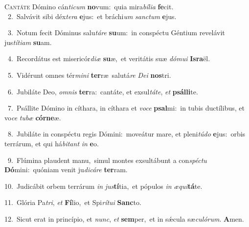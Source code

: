 \lettrine{\initial\textcolor{\initialcolor}{C}}{antáte} Dómino cán\-\textit{ti}\-\textit{cum} \textbf{no}\-vum:~\star quia mira\-\textit{bí}\-\textit{li}\textit{a} \textbf{fe}\-cit.\\
{\numbfont\textcolor{\numbcolor}{~2.}}~Salvávit sibi déx\-\textit{te}\-\textit{ra} \textbf{e}\-jus:~\star et bráchi\textit{um} \textit{sanc}\-\textit{tum} \textbf{e}\-jus.\par
{\numbfont\textcolor{\numbcolor}{~3.}}~Notum fecit Dóminus salu\-\textit{tá}\-\textit{re} \textbf{su}\-um:~\star in conspéctu Géntium revelávit jus\-\textit{tí}\-\textit{ti}\textit{am} \textbf{su}\-am.\par
{\numbfont\textcolor{\numbcolor}{~4.}}~Recordátus est misericór\-\textit{di}\-\textit{æ} \textbf{su}\-æ,~\star et veritátis suæ \textit{dó}\-\textit{mu}\textit{i} \textbf{Is}\-\textbf{ra}ël.\par
{\numbfont\textcolor{\numbcolor}{~5.}}~Vidérunt omnes tér\-\textit{mi}\-\textit{ni} \textbf{ter}\-ræ~\star salutá\textit{re} \textit{De}\-\textit{i} \textbf{nos}\-tri.\par
{\numbfont\textcolor{\numbcolor}{~6.}}~Jubiláte Deo, \textit{om}\-\textit{nis} \textbf{ter}\-ra:~\star cantáte, et exsul\-\textit{tá}\-\textit{te}, \textit{et} \textbf{psál}\-\textbf{li}te.\par
{\numbfont\textcolor{\numbcolor}{~7.}}~Psállite Dómino in cíthara, in cíthara et \textit{vo}\-\textit{ce} \textbf{psal}\-mi:~\star in tubis ductílibus, et vo\textit{ce} \textit{tu}\-\textit{bæ} \textbf{cór}\-\textbf{ne}æ.\par
{\numbfont\textcolor{\numbcolor}{~8.}}~Jubiláte in conspéctu regis Dómini:~\dagger moveátur mare, et pleni\-\textit{tú}\-\textit{do} \textbf{e}\-jus:~\star orbis terrárum, et qui há\-\textit{bi}\-\textit{tant} \textit{in} \textbf{e}\-o.\par
{\numbfont\textcolor{\numbcolor}{~9.}}~Flúmina plaudent manu,~\dagger simul montes exsultábunt a con\-\textit{spéc}\-\textit{tu} \textbf{Dó}\-mini:~\star quóniam venit ju\-\textit{di}\-\textit{cá}\textit{re} \textbf{ter}\-ram.\par
{\numbfont\textcolor{\numbcolor}{10.}}~Judicábit orbem terrárum \textit{in} \textit{jus}\-\textbf{tí}tia,~\star et pópulos \textit{in} \textit{æ}\-\textit{qui}\textbf{tá}te.\par
{\numbfont\textcolor{\numbcolor}{11.}}~Glória Pa\-\textit{tri}\-, \textit{et} \textbf{Fí}\-lio,~\star et Spi\-\textit{rí}\-\textit{tu}\textit{i} \textbf{Sanc}\-to.\par
{\numbfont\textcolor{\numbcolor}{12.}}~Sicut erat in princípio, et \textit{nunc}\-, \textit{et} \textbf{sem}\-per,~\star et in sǽcula sæ\-\textit{cu}\-\textit{ló}\textit{rum}. \textbf{A}\-men.\par
